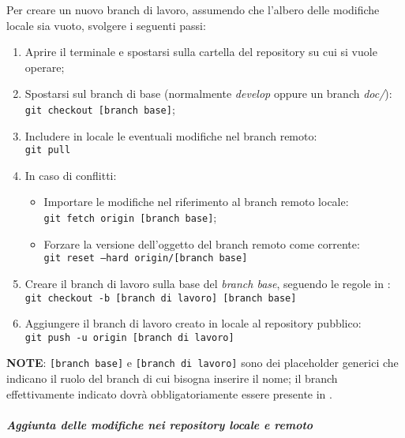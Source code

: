 Per creare un nuovo branch di lavoro, assumendo che l'albero delle modifiche locale sia vuoto, svolgere i seguenti passi:
\begin{enumerate}
	\item Aprire il terminale e spostarsi sulla cartella del repository su cui si vuole operare;
	\item Spostarsi sul branch di base (normalmente \emph{develop} oppure un branch \emph{doc/}):\\
			\texttt{git checkout [branch base]};
	\item Includere in locale le eventuali modifiche nel branch remoto:\\
			\texttt{git pull}
	\item In caso di conflitti:
		\begin{itemize}
			\item Importare le modifiche nel riferimento al branch remoto locale:\\
					\texttt{git fetch origin [branch base]};
			\item Forzare la versione dell'oggetto del branch remoto come corrente:\\
					\texttt{git reset --hard origin/[branch base]}
		\end{itemize}
	\item Creare il branch di lavoro sulla base del \emph{branch base}, seguendo le regole in :\\
			\texttt{git checkout -b [branch di lavoro] [branch base]}
	\item Aggiungere il branch di lavoro creato in locale al repository pubblico:\\
			\texttt{git push -u origin [branch di lavoro]}
\end{enumerate}
\textbf{NOTE}: \texttt{[branch base]} e \texttt{[branch di lavoro]} sono dei placeholder generici che indicano il ruolo del branch di cui 
bisogna inserire il nome; il branch effettivamente indicato dovrà obbligatoriamente essere presente in .

\subparagraph{Aggiunta delle modifiche nei repository locale e remoto}
\label{spar:aggiunta_modifiche}

